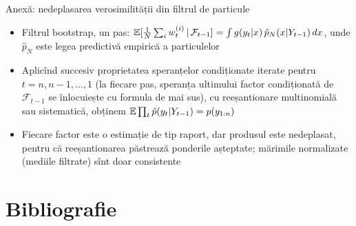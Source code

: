 \begin{frame}{Anexă: nedeplasarea verosimilității din filtrul de particule}
\hypertarget{atsapp3}{}
\itemsize{\small}
\begin{itemize}
    \item Filtrul bootstrap, un pas: $\mathbb{E}[\frac1N\sum_iw^{(i)}_t\,|\,\mathcal F_{t-1}] = \int g(y_t | x)\,\hat p_{N}(x | Y_{t-1})\,dx$, unde $\hat p_N$ este legea predictivă empirică a particulelor
    \item Aplicînd succesiv proprietatea speranțelor condiționate iterate pentru $t = n, n-1, \dots, 1$ (la fiecare pas, speranța ultimului factor condiționată de $\mathcal F_{t-1}$ se înlocuiește cu formula de mai sus), cu reeșantionare multinomială sau sistematică, obținem $\mathbb{E}\prod_t\hat p(y_t | Y_{t-1}) = p(y_{1:n})$ 
    \item Fiecare factor este o estimație de tip raport, dar produsul este nedeplasat, pentru că reeșantionarea păstrează ponderile așteptate; mărimile normalizate (mediile filtrate) sînt doar consistente
\end{itemize}
\end{frame}


\section{Bibliografie}

